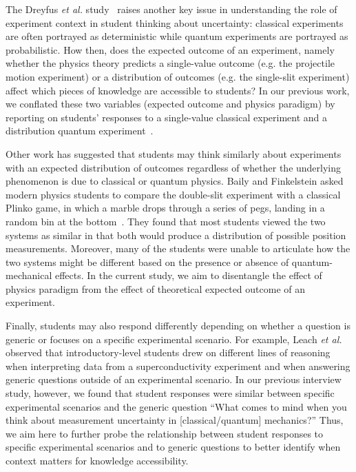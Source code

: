 \documentclass[english,aps,prstper,reprint,showpacs,longbibliography,superscriptaddress,nofootinbib]{revtex4-2}
\begin{document}
The Dreyfus \textit{et al.} study~\cite{Dreyfus2019} raises another key issue in understanding the role of experiment context in student thinking about uncertainty: classical experiments are often portrayed as deterministic while quantum experiments are portrayed as probabilistic. How then, does the expected outcome of an experiment, namely whether the physics theory predicts a single-value outcome (e.g. the projectile motion experiment) or a distribution of outcomes (e.g. the single-slit experiment) affect which pieces of knowledge are accessible to students? In our previous work, we conflated these two variables (expected outcome and physics paradigm) by reporting on students' responses to a single-value classical experiment and a distribution quantum experiment~\cite{Stein2019, Stump2020}.

Other work has suggested that students may think similarly about experiments with an expected distribution of outcomes regardless of whether the underlying phenomenon is due to classical or quantum physics. Baily and Finkelstein asked modern physics students to compare the double-slit experiment with a classical Plinko game, in which a marble drops through a series of pegs, landing in a random bin at the bottom~\cite{Baily2009a}. They found that most students viewed the two systems as similar in that both would produce a distribution of possible position measurements. Moreover, many of the students were unable to articulate how the two systems might be different based on the presence or absence of quantum-mechanical effects. In the current study, we aim to disentangle the effect of physics paradigm from the effect of theoretical expected outcome of an experiment.

Finally, students may also respond differently depending on whether a question is generic or focuses on a specific experimental scenario. For example, Leach \textit{et al.}~\cite{Leach2000} observed that introductory-level students drew on different lines of reasoning when interpreting data from a superconductivity experiment and when answering generic questions outside of an experimental scenario. In our previous interview study, however, we found that student responses were similar between specific experimental scenarios and the generic question ``What comes to mind when you think about measurement uncertainty in [classical/quantum] mechanics?'' Thus, we aim here to further probe the relationship between student responses to specific experimental scenarios and to generic questions to better identify when context matters for knowledge accessibility.
\end{document}
